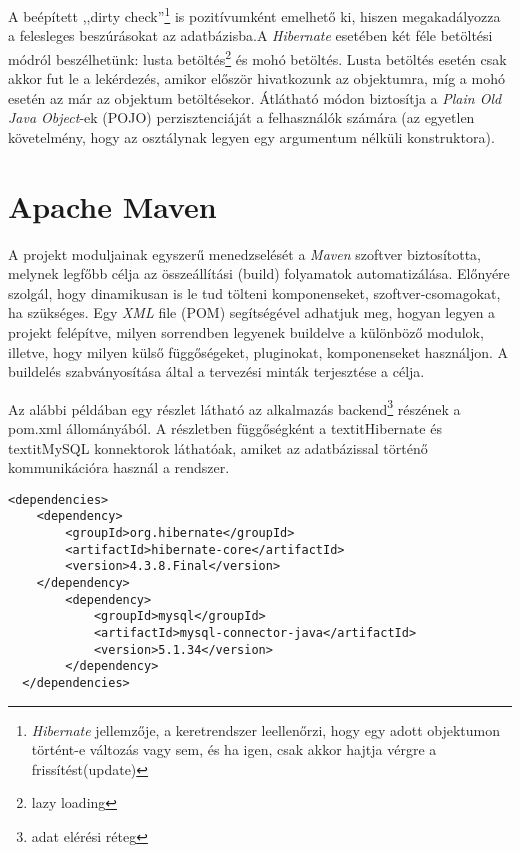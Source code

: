 \par A beépített ,,dirty check”\footnote{\textit{Hibernate} jellemzője, a keretrendszer leellenőrzi, hogy egy adott objektumon történt-e változás vagy sem, és ha igen, csak akkor hajtja vérgre a frissítést(update)} is pozitívumként emelhető ki, hiszen megakadályozza a felesleges beszúrásokat az adatbázisba.A \textit{Hibernate} esetében két féle betöltési módról beszélhetünk: lusta betöltés\footnote{lazy loading} és mohó betöltés. Lusta betöltés esetén csak akkor fut le a  lekérdezés, amikor először hivatkozunk az objektumra, míg a mohó esetén az már az objektum betöltésekor. Átlátható módon biztosítja a \textit{Plain Old Java Object}-ek (POJO) perzisztenciáját a felhasználók számára (az egyetlen követelmény, hogy az osztálynak legyen egy argumentum nélküli konstruktora).
%
\section{Apache Maven}\label{sec:FELH:am}

A projekt moduljainak egyszerű menedzselését a \textit{Maven} szoftver biztosította, melynek legfőbb célja az összeállítási (build)  folyamatok automatizálása. Előnyére szolgál, hogy dinamikusan is le tud tölteni komponenseket, szoftver-csomagokat, ha szükséges. Egy \textit{XML} file (POM) segítségével adhatjuk meg, hogyan legyen a projekt felépítve, milyen sorrendben legyenek buildelve a különböző modulok, illetve, hogy milyen külső függőségeket, pluginokat, komponenseket használjon. A buildelés szabványosítása által a tervezési minták terjesztése a célja.
\par Az alábbi példában egy részlet látható az alkalmazás backend\footnote{adat elérési réteg} részének a  pom.xml állományából. A részletben függőségként a textit{Hibernate} és textit{MySQL} konnektorok láthatóak, amiket az adatbázissal történő kommunikációra használ a rendszer.
\lstset{language=XML}
\begin{lstlisting}
<dependencies>
  	<dependency>
		<groupId>org.hibernate</groupId>
		<artifactId>hibernate-core</artifactId>
		<version>4.3.8.Final</version>
	</dependency>
		<dependency>
			<groupId>mysql</groupId>
			<artifactId>mysql-connector-java</artifactId>
			<version>5.1.34</version>
		</dependency>
  </dependencies>
\end{lstlisting}

